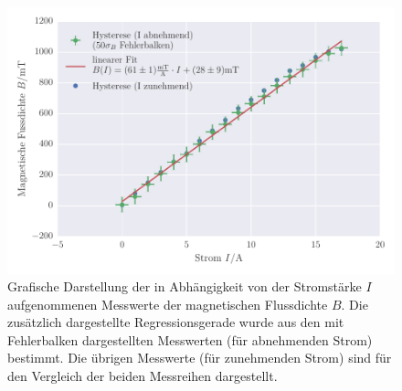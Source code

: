 \FloatBarrier
\begin{figure}[!h]
\centering
\includegraphics[scale=1]{../Grafiken/Hysterese_Messung_II_abnehmend.pdf}
\caption{Grafische Darstellung der in Abhängigkeit von der Stromstärke $I$
         aufgenommenen Messwerte der magnetischen Flussdichte $B$.
         Die zusätzlich dargestellte Regressionsgerade wurde aus den mit
         Fehlerbalken dargestellten Messwerten (für abnehmenden Strom) bestimmt.
         Die übrigen Messwerte (für zunehmenden Strom) sind für den Vergleich
         der beiden Messreihen dargestellt.\label{fig:hysterese_messung_ii_abnehmend}}
\end{figure}
\FloatBarrier
